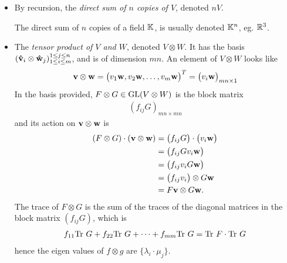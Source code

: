 \begin{itemize}
			\item By recursion, the \emph{direct sum of $n$ copies of $V$}, denoted $nV$.
				\begin{example}
					The direct sum of $n$ copies of a field $\mathbb{K}$, is usually denoted $\mathbb{K}^n$, eg. $\mathbb{R}^3$.
				\end{example}
				
			\item The \emph{tensor product of $V$ and $W$}, denoted $V \otimes W$.
				\subitem It has the basis $(\mathbf{\hat{v}}_i \otimes \mathbf{\hat{w}}_j)_{1 \leq i \leq m}^{1 \leq j \leq n}$, and is of dimension $mn$.
				\subitem An element of $V \otimes W$ looks like \begin{align*}
					\mathbf{v} \otimes \mathbf{w} = \begin{pmatrix}
						v_1\mathbf{w}, v_2\mathbf{w}, \dots, v_m\mathbf{w}
					\end{pmatrix}^T = \begin{pmatrix}
						v_i\mathbf{w}
					\end{pmatrix}_{mn \times 1} 
				\end{align*}
				\subitem In the basis provided, $F \otimes G \in \text{GL}(V \otimes W)$ is the block matrix 
				\begin{align*}
					(f_{ij}G)_{mn \times mn}
				\end{align*}
				and its action on $\mathbf{v} \otimes \mathbf{w}$ is 
				\begin{align*}
					(F \otimes G ) \cdot (\mathbf{v}  \otimes \mathbf{w}) &= \begin{pmatrix}
						f_{ij}G
					\end{pmatrix}\cdot \begin{pmatrix}
						v_i\mathbf{w}
					\end{pmatrix} \\ 
					&= \begin{pmatrix}
						f_{ij}G v_i \mathbf{w}
					\end{pmatrix} \\ 
					&= \begin{pmatrix}
						f_{ij} v_i G\mathbf{w}
					\end{pmatrix} \\
					&=  \begin{pmatrix}
						f_{ij}v_i
					\end{pmatrix} \otimes G\mathbf{w} \\
					&= F\mathbf{v} \otimes G\mathbf{w}.
				\end{align*}
				\subitem The trace of $F \otimes G$ is the sum of the traces of the diagonal matrices in the block matrix $(f_{ij}G)$, which is 
				\begin{align*}
					f_{11} \text{Tr } G + f_{22} \text{Tr } G + \dots + f_{mm} \text{Tr } G = \text{Tr } F \cdot \text{Tr } G
				\end{align*}
				hence the eigen values of $f \otimes g$ are $\{\lambda_i \cdot \mu_j\}$.
				

\end{itemize}
